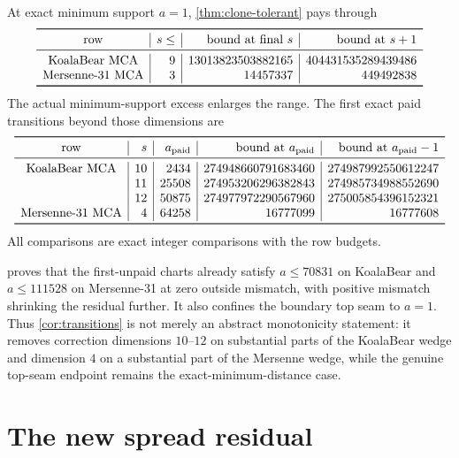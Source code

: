 \documentclass[11pt,a4paper]{amsart}
\numberwithin{equation}{section}
\theoremstyle{remark}
\begin{document}
\begin{corollary}\label{cor:transitions}
At exact minimum support $a=1$, \cref{thm:clone-tolerant} pays through
\[
\begin{array}{c|r|r|r}
\toprule
\text{row}&s\le&\text{bound at final }s&\text{bound at }s+1\\
\midrule
\text{KoalaBear MCA}&9&13013823503882165&404431535289439486\\
\text{Mersenne-31 MCA}&3&14457337&449492838\\
\bottomrule
\end{array}
\]
The actual minimum-support excess enlarges the range.  The first exact paid transitions beyond those dimensions are
\[
\begin{array}{c|r|r|r|r}
\toprule
\text{row}&s&a_{\rm paid}&\text{bound at }a_{\rm paid}&\text{bound at }a_{\rm paid}-1\\
\midrule
\text{KoalaBear MCA}&10&2434&274948660791683460&274987992550612247\\
&11&25508&274953206296382843&274985734988552690\\
&12&50875&274977972290567960&275005854396152321\\
\text{Mersenne-31 MCA}&4&64258&16777099&16777608\\
\bottomrule
\end{array}
\]
All comparisons are exact integer comparisons with the row budgets.
\end{corollary}

\begin{remark}
 proves that the first-unpaid charts already satisfy $a\le70831$ on KoalaBear and $a\le111528$ on Mersenne-31 at zero outside mismatch, with positive mismatch shrinking the residual further.  It also confines the boundary top seam to $a=1$.  Thus \cref{cor:transitions} is not merely an abstract monotonicity statement: it removes correction dimensions $10$--$12$ on substantial parts of the KoalaBear wedge and dimension $4$ on a substantial part of the Mersenne wedge, while the genuine top-seam endpoint remains the exact-minimum-distance case.
\end{remark}

\section{The new spread residual}
\end{document}
